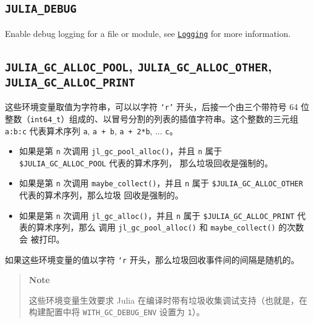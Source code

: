 \hypertarget{8362221794188602098}{}


\subsection{\texttt{JULIA\_DEBUG}}



Enable debug logging for a file or module, see \href{@ref Logging}{\texttt{Logging}} for more information.



\hypertarget{17935900017233878037}{}


\subsection{\texttt{JULIA\_GC\_ALLOC\_POOL}, \texttt{JULIA\_GC\_ALLOC\_OTHER}, \texttt{JULIA\_GC\_ALLOC\_PRINT}}



这些环境变量取值为字符串，可以以字符 \texttt{‘r’} 开头，后接一个由三个带符号 64 位整数（\texttt{int64\_t}）组成的、以冒号分割的列表的插值字符串。这个整数的三元组 \texttt{a:b:c} 代表算术序列 \texttt{a}, \texttt{a + b}, \texttt{a + 2*b}, ... \texttt{c}。



\begin{itemize}
\item 如果是第 \texttt{n} 次调用 \texttt{jl\_gc\_pool\_alloc()}，并且 \texttt{n}   属于 \texttt{\$JULIA\_GC\_ALLOC\_POOL} 代表的算术序列，   那么垃圾回收是强制的。


\item 如果是第 \texttt{n} 次调用 \texttt{maybe\_collect()}，并且 \texttt{n} 属于   \texttt{\$JULIA\_GC\_ALLOC\_OTHER} 代表的算术序列，那么垃圾   回收是强制的。


\item 如果是第 \texttt{n} 次调用 \texttt{jl\_gc\_alloc()}，并且 \texttt{n} 属于   \texttt{\$JULIA\_GC\_ALLOC\_PRINT} 代表的算术序列，那么   调用 \texttt{jl\_gc\_pool\_alloc()} 和 \texttt{maybe\_collect()} 的次数会   被打印。

\end{itemize}


如果这些环境变量的值以字符 \texttt{‘r{\textquotesingle}} 开头，那么垃圾回收事件间的间隔是随机的。



\begin{quote}
\textbf{Note}

这些环境变量生效要求 Julia 在编译时带有垃圾收集调试支持（也就是，在构建配置中将 \texttt{WITH\_GC\_DEBUG\_ENV} 设置为 \texttt{1}）。

\end{quote}


